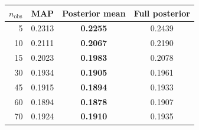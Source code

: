 \begin{tabular}{rccc}
\toprule
$n_{\text{obs}}$ & MAP & Posterior mean & Full posterior \\
\midrule
5 & 0.2313 & \textbf{0.2255} & 0.2439 \\
10 & 0.2111 & \textbf{0.2067} & 0.2190 \\
15 & 0.2023 & \textbf{0.1983} & 0.2078 \\
30 & 0.1934 & \textbf{0.1905} & 0.1961 \\
45 & 0.1915 & \textbf{0.1894} & 0.1933 \\
60 & 0.1894 & \textbf{0.1878} & 0.1907 \\
70 & 0.1924 & \textbf{0.1910} & 0.1935 \\
\bottomrule
\end{tabular}
